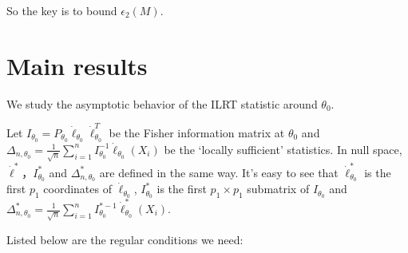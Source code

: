 \documentclass[3p]{elsarticle}
\theoremstyle{plain}
\theoremstyle{definition}
\theoremstyle{remark}
\begin{document}
So the key is to bound $\epsilon_2(M)$.

\section{Main results}


We study the asymptotic behavior of the ILRT statistic around $\theta_0$.

Let $I_{\theta_0}=P_{\theta_0}\dot{\ell}_{\theta_0}\dot{\ell}_{\theta_0}^T$ be the Fisher information matrix at $\theta_0$ and $\Delta_{n,\theta_0}=\frac{1}{\sqrt{n}}\sum_{i=1}^n I_{\theta_0}^{-1}\dot{\ell}_{\theta_0}(X_i)$ be the `locally sufficient' statistics. In null space, $\dot{\ell}^*$，$I^*_{\theta_0}$ and $\Delta_{n,\theta_0}^*$ are defined in the same way. It's easy to see that $\dot{\ell}^*_{\theta_0}$ is the first $p_1$
coordinates of $\dot{\ell}_{\theta_0}$, $I^*_{\theta_0}$ is the  first $p_1\times p_1$ submatrix of $I_{\theta_0}$ and $\Delta_{n,\theta_0}^*=\frac{1}{\sqrt{n}}\sum_{i=1}^n I_{\theta_0}^{*-1}\dot{\ell}^*_{\theta_0}(X_i)$.


Listed below are the regular conditions we need:
\end{document}
